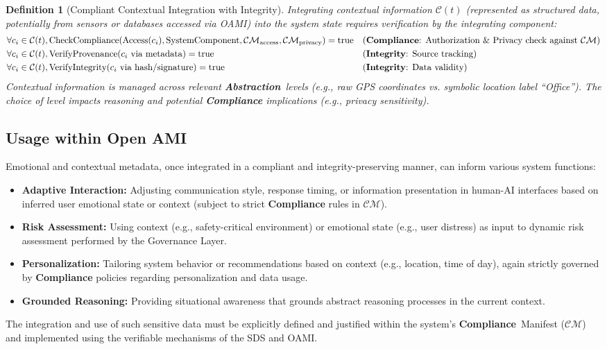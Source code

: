 \documentclass[12pt,a4paper]{report}
\newtheorem{definition}{Definition}[section]
\newcommand{\Compliance}{\textbf{Compliance}}
\newcommand{\Integrity}{\textbf{Integrity}}
\newcommand{\Abstraction}{\textbf{Abstraction}}
\begin{document}
	\begin{definition}[Compliant Contextual Integration with Integrity]
		\label{def:context_integration}
		Integrating contextual information $\mathcal{C}(t)$ (represented as structured data, potentially from sensors or databases accessed via OAMI) into the system state requires verification by the integrating component:
		\begin{align}
			&\forall c_i \in \mathcal{C}(t), \text{CheckCompliance}(\text{Access}(c_i), \text{SystemComponent}, \mathcal{CM}_{\text{access}}, \mathcal{CM}_{\text{privacy}}) = \text{true} && \text{(\textbf{Compliance}: Authorization \& Privacy check against } \mathcal{CM} \text{)} \\
			&\forall c_i \in \mathcal{C}(t), \text{VerifyProvenance}(c_i \text{ via metadata}) = \text{true} && \text{(\Integrity: Source tracking)} \\
			&\forall c_i \in \mathcal{C}(t), \text{VerifyIntegrity}(c_i \text{ via hash/signature}) = \text{true} && \text{(\Integrity: Data validity)}
		\end{align}
		Contextual information is managed across relevant \Abstraction\ levels (e.g., raw GPS coordinates vs. symbolic location label ``Office''). The choice of level impacts reasoning and potential \textbf{Compliance} implications (e.g., privacy sensitivity).
	\end{definition}
	
	\subsection{Usage within Open AMI}
	Emotional and contextual metadata, once integrated in a compliant and integrity-preserving manner, can inform various system functions:
	\begin{itemize}
		\item \textbf{Adaptive Interaction:} Adjusting communication style, response timing, or information presentation in human-AI interfaces based on inferred user emotional state or context (subject to strict \textbf{Compliance} rules in $\mathcal{CM}$).
		\item \textbf{Risk Assessment:} Using context (e.g., safety-critical environment) or emotional state (e.g., user distress) as input to dynamic risk assessment performed by the Governance Layer.
		\item \textbf{Personalization:} Tailoring system behavior or recommendations based on context (e.g., location, time of day), again strictly governed by \textbf{Compliance} policies regarding personalization and data usage.
		\item \textbf{Grounded Reasoning:} Providing situational awareness that grounds abstract reasoning processes in the current context.
	\end{itemize}
	The integration and use of such sensitive data must be explicitly defined and justified within the system's \Compliance\ Manifest ($\mathcal{CM}$) and implemented using the verifiable mechanisms of the SDS and OAMI.
	
\end{document}
